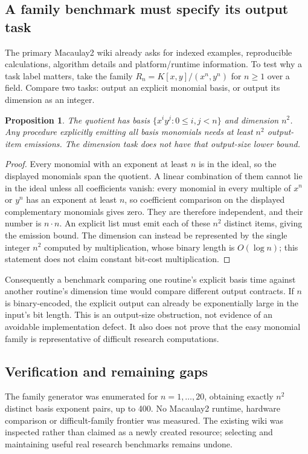 \documentclass[11pt]{article}
\newtheorem{proposition}{Proposition}
\begin{document}
\subsection{A family benchmark must specify its output task}
The primary Macaulay2 wiki already asks for indexed examples, reproducible calculations, algorithm details and platform/runtime information. To test why a task label matters, take the family $R_n=K[x,y]/(x^n,y^n)$ for $n\ge1$ over a field. Compare two tasks: output an explicit monomial basis, or output its dimension as an integer.
\begin{proposition}
The quotient has basis $\{x^iy^j:0\le i,j<n\}$ and dimension $n^2$. Any procedure explicitly emitting all basis monomials needs at least $n^2$ output-item emissions. The dimension task does not have that output-size lower bound.
\end{proposition}
\begin{proof}
Every monomial with an exponent at least $n$ is in the ideal, so the displayed monomials span the quotient. A linear combination of them cannot lie in the ideal unless all coefficients vanish: every monomial in every multiple of $x^n$ or $y^n$ has an exponent at least $n$, so coefficient comparison on the displayed complementary monomials gives zero. They are therefore independent, and their number is $n\cdot n$. An explicit list must emit each of these $n^2$ distinct items, giving the emission bound. The dimension can instead be represented by the single integer $n^2$ computed by multiplication, whose binary length is $O(\log n)$; this statement does not claim constant bit-cost multiplication.
\end{proof}
Consequently a benchmark comparing one routine's explicit basis time against another routine's dimension time would compare different output contracts. If $n$ is binary-encoded, the explicit output can already be exponentially large in the input's bit length. This is an output-size obstruction, not evidence of an avoidable implementation defect. It also does not prove that the easy monomial family is representative of difficult research computations.
\subsection{Verification and remaining gaps}
The family generator was enumerated for $n=1,\ldots,20$, obtaining exactly $n^2$ distinct basis exponent pairs, up to 400. No Macaulay2 runtime, hardware comparison or difficult-family frontier was measured. The existing wiki was inspected rather than claimed as a newly created resource; selecting and maintaining useful real research benchmarks remains undone.
\end{document}
